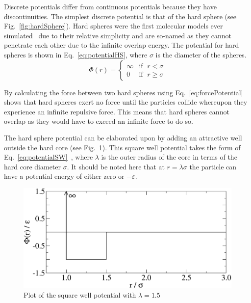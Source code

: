 \documentclass[12pt]{UoAthesis} \usepackage{booktabs}
\begin{document}
Discrete potentials differ from continuous potentials because they
have discontinuities.  The simplest discrete potential is that of the
hard sphere (see Fig.~\ref{fig:hardSphere}). Hard spheres were the
first molecular models ever simulated~\cite{Alder1957} due to their
relative simplicity and are so-named as they cannot penetrate each
other due to the infinite overlap energy. The potential for hard
spheres is shown in Eq.~\eqref{eq:potentialHS}, where $\sigma$ is
the diameter of the spheres.
\begin{equation}
  \label{eq:potentialHS}
  \Phi(r) = 
  \begin{cases}
    \infty &\text{if }\; r < \sigma \\
    0 &\text{if }\; r \geq \sigma
  \end{cases}
\end{equation}

By calculating the force between two hard spheres using
Eq.~\eqref{eq:forcePotential} shows that hard spheres exert no force
until the particles collide whereupon they experience an infinite
repulsive force.  This means that hard spheres cannot overlap as they
would have to exceed an infinite force to do so.

The hard sphere potential can be elaborated upon by adding an
attractive well outside the hard core (see Fig.~\ref{fig:squareWell}).
This square well potential takes the form of
Eq.~\eqref{eq:potentialSW}~\cite{Barker1967}, where $\lambda$ is the
outer radius of the core in terms of the hard core diameter $\sigma$.
It should be noted here that at $r=\lambda\sigma$ the particle can
have a potential energy of either zero or $-\varepsilon$.

\begin{figure}[htp] 
  \begin{center}
    \includegraphics[clip,scale = 0.45]{figures/squareWell} 
    \caption[Plot of the square well potential]
    {\label{fig:squareWell} Plot of the square well potential with $\lambda=1.5$}
  \end{center}
\end{figure}
\end{document}
